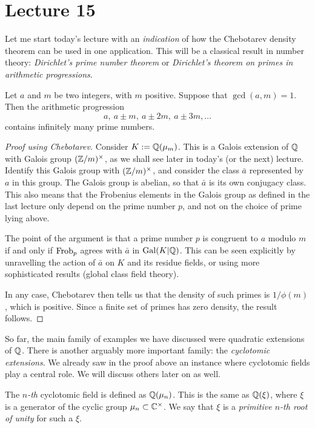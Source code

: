\section{Lecture 15}

Let me start today's lecture with an \emph{indication} of how the Chebotarev density theorem can be used in one application.
This will be a classical result in number theory: \emph{Dirichlet's prime number theorem} or \emph{Dirichlet's theorem on primes in arithmetic progressions}.

\begin{theorem}
  Let $a$ and $m$ be two integers, with $m$ positive.
  Suppose that $\gcd(a,m) = 1$.
  Then the arithmetic progression
  \[ a, \ a \pm m, \ a \pm 2m, \ a \pm 3m, \ldots \]
  contains infinitely many prime numbers.
\end{theorem}
\begin{proof}[Proof using Chebotarev]
  Consider $K := \mathbb{Q}(\mu_{m})$.
  This is a Galois extension of $\mathbb{Q}$ with Galois group $(\mathbb{Z}/m)^{\times}$, as we shall see later in today's (or the next) lecture.
  Identify this Galois group with $(\mathbb{Z}/m)^{\times}$, and consider the class $\bar a$ represented by $a$ in this group.
  The Galois group is abelian, so that $\bar a$ is its own conjugacy class.
  This also means that the Frobenius elements in the Galois group as defined in the last lecture only depend on the prime number $p$, and not on the choice of prime lying above.

  The point of the argument is that a prime number $p$ is congruent to $a$ modulo $m$ if and only if $\operatorname{Frob}_{p}$ agrees with $\bar a$ in $\operatorname{Gal}(K|\mathbb{Q})$.
  This can be seen explicitly by unravelling the action of $\bar a$ on $K$ and its residue fields, or using more sophisticated results (global class field theory).

  In any case, Chebotarev then tells us that the density of such primes is $1/\phi(m)$, which is positive.
  Since a finite set of primes has zero density, the result follows.
\end{proof}

So far, the main family of examples we have discussed were quadratic extensions of $\mathbb{Q}$.
There is another arguably more important family: the \emph{cyclotomic extensions}.
We already saw in the proof above an instance where cyclotomic fields play a central role.
We will discuss others later on as well.

The \emph{$n$-th} cyclotomic field is defined as $\mathbb{Q}(\mu_{n})$.
This is the same as $\mathbb{Q}(\xi)$, where $\xi$ is a generator of the cyclic group $\mu_{n} \subset \mathbb{C}^{\times}$.
We say that $\xi$ is a \emph{primitive $n$-th root of unity} for such a $\xi$.

